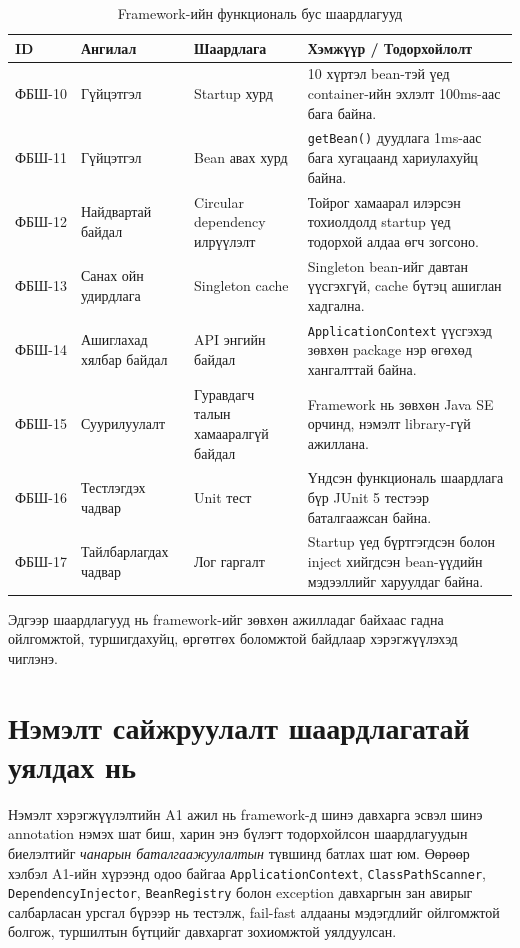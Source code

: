 \begin{table}[H]
\centering
\small
\setlength{\tabcolsep}{4pt}
\caption{Framework-ийн функциональ бус шаардлагууд}
\label{tab:nonfunctional-requirements}
\renewcommand{\arraystretch}{1.2}
\begin{tabularx}{\textwidth}{|L{1.5cm}|L{2.5cm}|L{2.7cm}|X|}
\hline
\textbf{ID} & \textbf{Ангилал} & \textbf{Шаардлага} & \textbf{Хэмжүүр / Тодорхойлолт} \\ \hline
ФБШ-10 & Гүйцэтгэл & Startup хурд & 10 хүртэл bean-тэй үед container-ийн эхлэлт 100ms-аас бага байна. \\ \hline
ФБШ-11 & Гүйцэтгэл & Bean авах хурд & \texttt{getBean()} дуудлага 1ms-аас бага хугацаанд хариулахуйц байна. \\ \hline
ФБШ-12 & Найдвартай байдал & Circular dependency илрүүлэлт & Тойрог хамаарал илэрсэн тохиолдолд startup үед тодорхой алдаа өгч зогсоно. \\ \hline
ФБШ-13 & Санах ойн удирдлага & Singleton cache & Singleton bean-ийг давтан үүсгэхгүй, cache бүтэц ашиглан хадгална. \\ \hline
ФБШ-14 & Ашиглахад хялбар байдал & API энгийн байдал & \texttt{ApplicationContext} үүсгэхэд зөвхөн package нэр өгөхөд хангалттай байна. \\ \hline
ФБШ-15 & Суурилуулалт & Гуравдагч талын хамааралгүй байдал & Framework нь зөвхөн Java SE орчинд, нэмэлт library-гүй ажиллана. \\ \hline
ФБШ-16 & Тестлэгдэх чадвар & Unit тест & Үндсэн функциональ шаардлага бүр JUnit 5 тестээр баталгаажсан байна. \\ \hline
ФБШ-17 & Тайлбарлагдах чадвар & Лог гаргалт & Startup үед бүртгэгдсэн болон inject хийгдсэн bean-үүдийн мэдээллийг харуулдаг байна. \\ \hline
\end{tabularx}
\end{table}
\normalsize

Эдгээр шаардлагууд нь framework-ийг зөвхөн ажилладаг байхаас гадна ойлгомжтой, туршигдахуйц, өргөтгөх боломжтой байдлаар хэрэгжүүлэхэд чиглэнэ.


\section{Нэмэлт сайжруулалт шаардлагатай уялдах нь}

Нэмэлт хэрэгжүүлэлтийн A1 ажил нь framework-д шинэ давхарга эсвэл шинэ annotation нэмэх шат биш, харин энэ бүлэгт тодорхойлсон шаардлагуудын биелэлтийг \textit{чанарын баталгаажуулалтын} түвшинд батлах шат юм. Өөрөөр хэлбэл A1-ийн хүрээнд одоо байгаа \texttt{ApplicationContext}, \texttt{ClassPathScanner}, \texttt{DependencyInjector}, \texttt{BeanRegistry} болон exception давхаргын зан авирыг салбарласан урсгал бүрээр нь тестэлж, fail-fast алдааны мэдэгдлийг ойлгомжтой болгож, туршилтын бүтцийг давхаргат зохиомжтой уялдуулсан.

